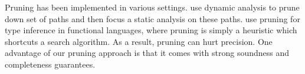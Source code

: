
%



Pruning has been implemented in various settings.
\cite{vipindeep05pruning} use dynamic analysis to prune down set of paths and
then focus a static analysis on these paths.
\cite{spoon04ddp} use pruning for type inference in functional languages,
where pruning is simply a heuristic which shortcuts a search algorithm.
As a result, pruning can hurt precision.
One advantage of our pruning approach is that it comes with strong soundness
and completeness guarantees.

